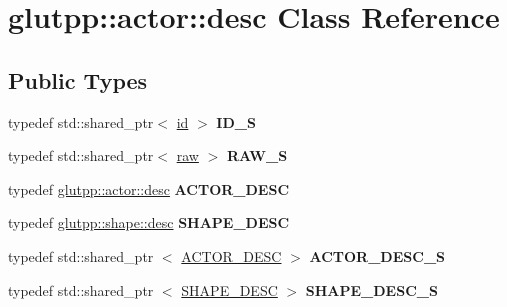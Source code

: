 \hypertarget{classglutpp_1_1actor_1_1desc}{\section{glutpp\-:\-:actor\-:\-:desc \-Class \-Reference}
\label{classglutpp_1_1actor_1_1desc}
}
\subsection*{\-Public \-Types}
\begin{DoxyCompactItemize}
\item 
\hypertarget{classglutpp_1_1actor_1_1desc_aaae756b471632c70adf1920797ad79bb}{typedef std\-::shared\-\_\-ptr$<$ \hyperlink{classglutpp_1_1actor_1_1id}{id} $>$ {\bfseries \-I\-D\-\_\-\-S}}\label{classglutpp_1_1actor_1_1desc_aaae756b471632c70adf1920797ad79bb}

\item 
\hypertarget{classglutpp_1_1actor_1_1desc_a9a0610417b9f36a2b14e789c98bab79d}{typedef std\-::shared\-\_\-ptr$<$ \hyperlink{classglutpp_1_1actor_1_1raw}{raw} $>$ {\bfseries \-R\-A\-W\-\_\-\-S}}\label{classglutpp_1_1actor_1_1desc_a9a0610417b9f36a2b14e789c98bab79d}

\item 
\hypertarget{classglutpp_1_1actor_1_1desc_aa75a232f73c013969c6473fc55c1f5c3}{typedef \hyperlink{classglutpp_1_1actor_1_1desc}{glutpp\-::actor\-::desc} {\bfseries \-A\-C\-T\-O\-R\-\_\-\-D\-E\-S\-C}}\label{classglutpp_1_1actor_1_1desc_aa75a232f73c013969c6473fc55c1f5c3}

\item 
\hypertarget{classglutpp_1_1actor_1_1desc_adafcf9dc5651635d539ecc213397d476}{typedef \hyperlink{classglutpp_1_1shape_1_1desc}{glutpp\-::shape\-::desc} {\bfseries \-S\-H\-A\-P\-E\-\_\-\-D\-E\-S\-C}}\label{classglutpp_1_1actor_1_1desc_adafcf9dc5651635d539ecc213397d476}

\item 
\hypertarget{classglutpp_1_1actor_1_1desc_a35f998f78c62b3dae29be29111d98228}{typedef std\-::shared\-\_\-ptr\*
$<$ \hyperlink{classglutpp_1_1actor_1_1desc}{\-A\-C\-T\-O\-R\-\_\-\-D\-E\-S\-C} $>$ {\bfseries \-A\-C\-T\-O\-R\-\_\-\-D\-E\-S\-C\-\_\-\-S}}\label{classglutpp_1_1actor_1_1desc_a35f998f78c62b3dae29be29111d98228}

\item 
\hypertarget{classglutpp_1_1actor_1_1desc_a5b94cca8a8464ee0f1d2d81e83a302ab}{typedef std\-::shared\-\_\-ptr\*
$<$ \hyperlink{classglutpp_1_1shape_1_1desc}{\-S\-H\-A\-P\-E\-\_\-\-D\-E\-S\-C} $>$ {\bfseries \-S\-H\-A\-P\-E\-\_\-\-D\-E\-S\-C\-\_\-\-S}}\label{classglutpp_1_1actor_1_1desc_a5b94cca8a8464ee0f1d2d81e83a302ab}


\end{DoxyCompactItemize}
